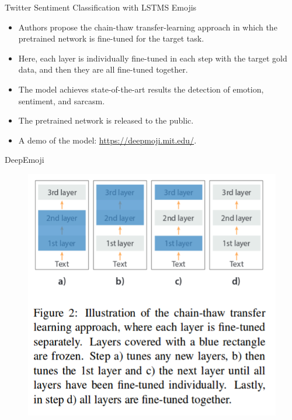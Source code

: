 \documentclass[handout]{beamer}
\begin{document}
\begin{frame}{Twitter Sentiment Classification with LSTMS Emojis}
\begin{scriptsize}
\begin{itemize}
\item Authors propose the chain-thaw transfer-learning approach in which the pretrained network is fine-tuned for the target task. 
\item Here, each layer is individually fine-tuned in each step with the target gold data, and then they are all fine-tuned together. 
\item The model achieves state-of-the-art results the detection of emotion, sentiment, and sarcasm. 
\item  The pretrained network is released to the public.

\item  A demo of the model: \url{https://deepmoji.mit.edu/}.
\end{itemize}
\end{scriptsize}
\end{frame}


\begin{frame}{DeepEmoji}
        
         \begin{figure}[h]
        	\includegraphics[scale = 0.45]{pics/deepEmoji3.png}
        \end{figure}        
        
\end{frame}
\end{document}
